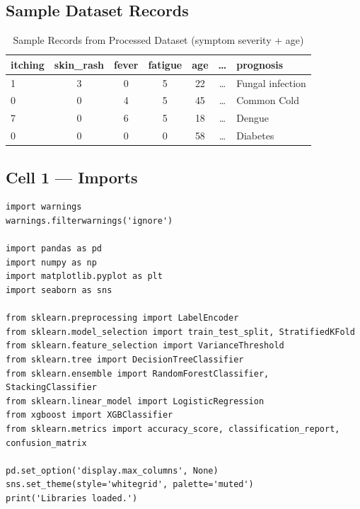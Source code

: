 \documentclass[12pt,a4paper]{article}
\begin{document}
\subsection{Sample Dataset Records}

\begin{table}[H]
\centering
\caption{Sample Records from Processed Dataset (symptom severity + age)}
\begin{tabular}{lcccccl}
\toprule
\textbf{itching} & \textbf{skin\_rash} & \textbf{fever} & \textbf{fatigue} & \textbf{age} & \textbf{\ldots} & \textbf{prognosis} \\
\midrule
1 & 3 & 0 & 5 & 22 & \ldots & Fungal infection \\
0 & 0 & 4 & 5 & 45 & \ldots & Common Cold \\
7 & 0 & 6 & 5 & 18 & \ldots & Dengue \\
0 & 0 & 0 & 0 & 58 & \ldots & Diabetes \\
\bottomrule
\end{tabular}
\end{table}

\subsection{Cell 1 --- Imports}

\begin{lstlisting}[caption=Cell 1: Library Imports]
import warnings
warnings.filterwarnings('ignore')

import pandas as pd
import numpy as np
import matplotlib.pyplot as plt
import seaborn as sns

from sklearn.preprocessing import LabelEncoder
from sklearn.model_selection import train_test_split, StratifiedKFold
from sklearn.feature_selection import VarianceThreshold
from sklearn.tree import DecisionTreeClassifier
from sklearn.ensemble import RandomForestClassifier, StackingClassifier
from sklearn.linear_model import LogisticRegression
from xgboost import XGBClassifier
from sklearn.metrics import accuracy_score, classification_report, confusion_matrix

pd.set_option('display.max_columns', None)
sns.set_theme(style='whitegrid', palette='muted')
print('Libraries loaded.')
\end{lstlisting}

\end{document}
